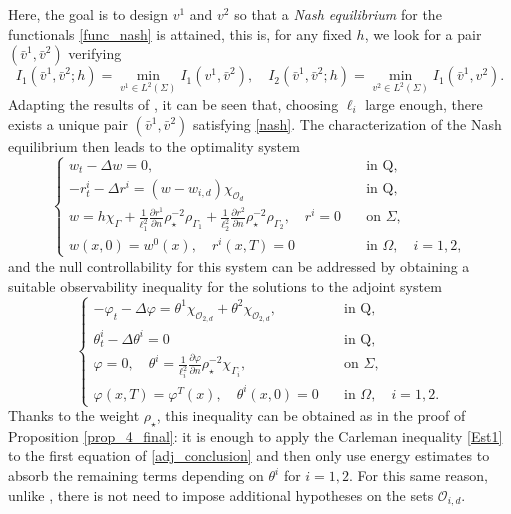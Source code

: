 \documentclass[preprint,10pt]{article}
\numberwithin{equation}{section}
\numberwithin{theorem}{section}
\def\cbd{\Gamma}
\begin{document}
{\begin{enumerate}
Here, the goal is to design $v^1$ and $v^2$ so that a \textit{Nash equilibrium} for the functionals \eqref{func_nash} is attained, this is,  for any fixed $h$, we look for a pair $(\bar v^1,\bar v^2)$ verifying  
%
\begin{equation}\label{nash}
I_1(\bar v^1,\bar v^2;h)=\min_{v^1\in L^2(\Sigma)}I_1(v^1,\bar v^2), \quad I_2(\bar v^1,\bar v^2;h)=\min_{v^2\in L^2(\Sigma)}I_1(\bar v^1, v^2).
\end{equation}
%
Adapting the results of \cite{araruna,vhs_corri}, it can be seen that, choosing $\ell_i$ large enough, there exists a unique pair $(\bar v^1,\bar v^2)$ satisfying \eqref{nash}. The characterization of the Nash equilibrium then leads to the optimality system
%
\begin{equation*}%
\begin{cases}
w_t-\Delta w=0, &\quad  \text{in Q}, \\
-r^{i}_t-\Delta r^{i}= (w-w_{i,d})\chi_{\mathcal O_d}  &\quad  \text{in Q},\\ 
w=h\chi_{\cbd}+ \frac{1}{\ell_1^2}\frac{\partial r^{1}}{\partial n}\rho_\star^{-2}\rho_{\Gamma_1}+\frac{1}{\ell_2^2}\frac{\partial r^{2}}{\partial n}\rho_\star^{-2}\rho_{ \Gamma_2}, \quad r^{i}=0 &\quad \text{on } \Sigma, \\
w(x,0)=w^0(x),\quad r^{i}(x,T)=0 &\quad \text{in } \Omega, \quad i=1,2,
\end{cases}
\end{equation*}
%
and the null controllability for this system can be addressed by obtaining a suitable observability inequality for the solutions to the adjoint system
%
\begin{equation}\label{adj_conclusion}
\begin{cases}
-\varphi_t-\Delta \varphi=\theta^1\chi_{\mathcal O_{2,d}}+\theta^2\chi_{\mathcal O_{2,d}}, &\quad  \text{in Q}, \\
\theta^{i}_t-\Delta \theta^{i}= 0 &\quad  \text{in Q},\\ 
\varphi=0, \quad \theta^{i}=\frac{1}{\ell_i^2}\frac{\partial \varphi}{\partial n}\rho_\star^{-2}\chi_{\Gamma_i}, &\quad \text{on } \Sigma, \\
\varphi(x,T)=\varphi^T(x),\quad \theta^{i}(x,0)=0 &\quad \text{in } \Omega, \quad i=1,2.
\end{cases}
\end{equation}
%
Thanks to the weight $\rho_\star$, this inequality can be obtained as in the proof of Proposition \ref{prop_4_final}: it is enough to apply the Carleman inequality \eqref{Est1} to the first equation of \eqref{adj_conclusion} and then only use energy estimates to absorb the remaining terms depending on $\theta^{i}$ for $i=1,2$. For this same reason, unlike \cite{araruna,vhs_corri}, there is not need to impose additional hypotheses on the sets $\mathcal O_{i,d}$.


\end{enumerate}}
\end{document}
